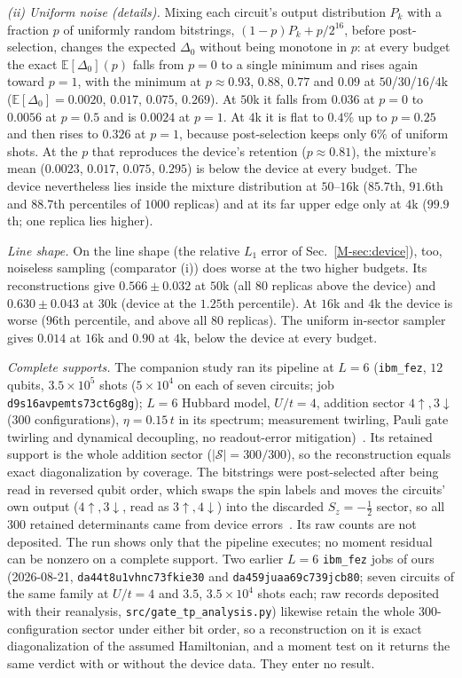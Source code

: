 \documentclass[aps,prb,onecolumn,superscriptaddress,longbibliography,floatfix]{revtex4-2}
\begin{document}
\emph{(ii) Uniform noise (details).} Mixing each circuit's output distribution $P_k$ with a fraction $p$ of uniformly random bitstrings, $(1-p)P_k+p/2^{16}$, before post-selection, changes the expected $\Delta_0$ without being monotone in $p$: at every budget the exact $\mathbb{E}[\Delta_0](p)$ falls from $p=0$ to a single minimum and rises again toward $p=1$, with the minimum at $p\approx0.93$, $0.88$, $0.77$ and $0.09$ at $50$/$30$/$16$/$4$k ($\mathbb{E}[\Delta_0]=0.0020$, $0.017$, $0.075$, $0.269$). At $50$k it falls from $0.036$ at $p=0$ to $0.0056$ at $p=0.5$ and is $0.0024$ at $p=1$. At $4$k it is flat to $0.4\%$ up to $p=0.25$ and then rises to $0.326$ at $p=1$, because post-selection keeps only $6\%$ of uniform shots. At the $p$ that reproduces the device's retention ($p\approx0.81$), the mixture's mean ($0.0023$, $0.017$, $0.075$, $0.295$) is below the device at every budget. The device nevertheless lies inside the mixture distribution at $50$--$16$k ($85.7$th, $91.6$th and $88.7$th percentiles of $1000$ replicas) and at its far upper edge only at $4$k ($99.9$th; one replica lies higher).

\emph{Line shape.} On the line shape (the relative $L_1$ error of Sec.~\ref{M-sec:device}), too, noiseless sampling (comparator (i)) does worse at the two higher budgets. Its reconstructions give $0.566\pm0.032$ at $50$k (all $80$ replicas above the device) and $0.630\pm0.043$ at $30$k (device at the $1.25$th percentile). At $16$k and $4$k the device is worse ($96$th percentile, and above all $80$ replicas). The uniform in-sector sampler gives $0.014$ at $16$k and $0.90$ at $4$k, below the device at every budget.

\emph{Complete supports.} The companion study ran its pipeline at $L=6$ (\texttt{ibm\_fez}, $12$ qubits, $3.5\times10^{5}$ shots ($5\times10^{4}$ on each of seven circuits; job \texttt{d9s16avpemts73ct6g8g}); $L=6$ Hubbard model, $U/t=4$, addition sector $4\!\uparrow,3\!\downarrow$ ($300$ configurations), $\eta=0.15\,t$ in its spectrum; measurement twirling, Pauli gate twirling and dynamical decoupling, no readout-error mitigation)~\cite{SQDspec2608}. Its retained support is the whole addition sector (${|\mathcal S|=300/300}$), so the reconstruction equals exact diagonalization by coverage. The bitstrings were post-selected after being read in reversed qubit order, which swaps the spin labels and moves the circuits' own output ($4\!\uparrow,3\!\downarrow$, read as $3\!\uparrow,4\!\downarrow$) into the discarded $S_z=-\tfrac12$ sector, so all $300$ retained determinants came from device errors~\cite{SQDspec2608}. Its raw counts are not deposited. The run shows only that the pipeline executes; no moment residual can be nonzero on a complete support. Two earlier $L=6$ \texttt{ibm\_fez} jobs of ours (2026-08-21, \texttt{da44t8u1vhnc73fkie30} and \texttt{da459juaa69c739jcb80}; seven circuits of the same family at $U/t=4$ and $3.5$, $3.5\times10^{4}$ shots each; raw records deposited with their reanalysis, \texttt{src/\allowbreak gate\_tp\_analysis.py}) likewise retain the whole $300$-configuration sector under either bit order, so a reconstruction on it is exact diagonalization of the assumed Hamiltonian, and a moment test on it returns the same verdict with or without the device data. They enter no result.
\end{document}
